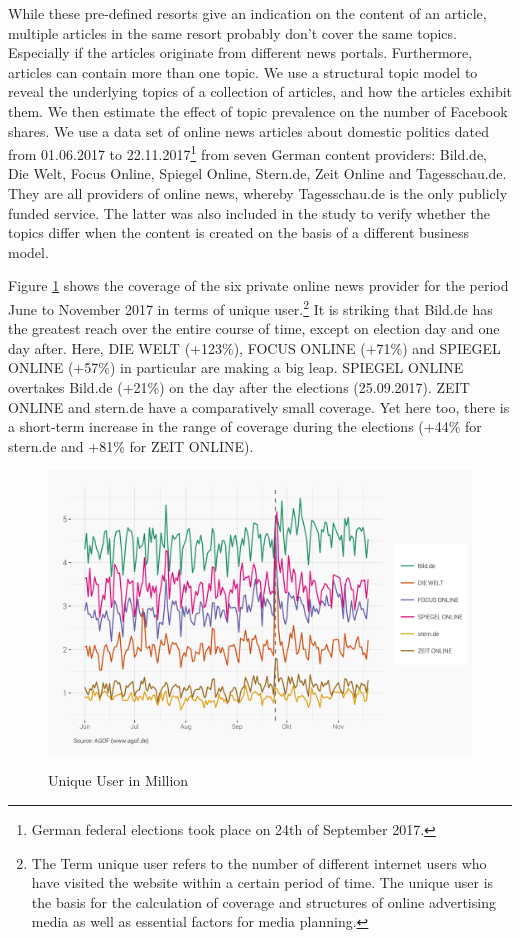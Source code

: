 \documentclass[12pt,a4paper,notitlepage]{article}
\begin{document}
While these pre-defined resorts give an indication on the content of an article, multiple articles in the same resort probably don't cover the same topics. Especially if the articles originate from different news portals. Furthermore, articles can contain more than one topic. We use a structural topic model to reveal the underlying topics of a collection of articles, and how the articles exhibit them. We then estimate the effect of topic prevalence on the number of Facebook shares. We use a data set of online news articles about domestic politics dated from 01.06.2017 to 22.11.2017\footnote{German federal elections took place on 24th of September 2017.} from seven German content providers: Bild.de, Die Welt, Focus Online, Spiegel Online, Stern.de, Zeit Online and Tagesschau.de. They are all providers of online news, whereby Tagesschau.de is the only publicly funded service. The latter was also included in the study to verify whether the topics differ when the content is created on the basis of a different business model. 

Figure \ref{fig_uuser} shows the coverage of the six private online news provider for the period June to November 2017 in terms of unique user.\footnote{The Term unique user refers to the number of different internet users who have visited the website within a certain period of time. The unique user is the basis for the calculation of coverage and structures of online advertising media as well as essential factors for media planning.} It is striking that Bild.de has the greatest reach over the entire course of time, except on election day and one day after. Here, DIE WELT (+123\%), FOCUS ONLINE (+71\%) and SPIEGEL ONLINE (+57\%) in particular are making a big leap. SPIEGEL ONLINE overtakes Bild.de (+21\%) on the day after the elections (25.09.2017). ZEIT ONLINE and stern.de have a comparatively small coverage. Yet here too, there is a short-term increase in the range of coverage during the elections (+44\% for stern.de and +81\%  for ZEIT ONLINE).


\begin{figure}[H]
	\caption{Unique User in Million}
	\begin{center}
			\includegraphics[width=.9\textwidth]{../figs/uniqueUser.png}
			\label{fig_uuser}
	\end{center}
\end{figure}
\end{document}
